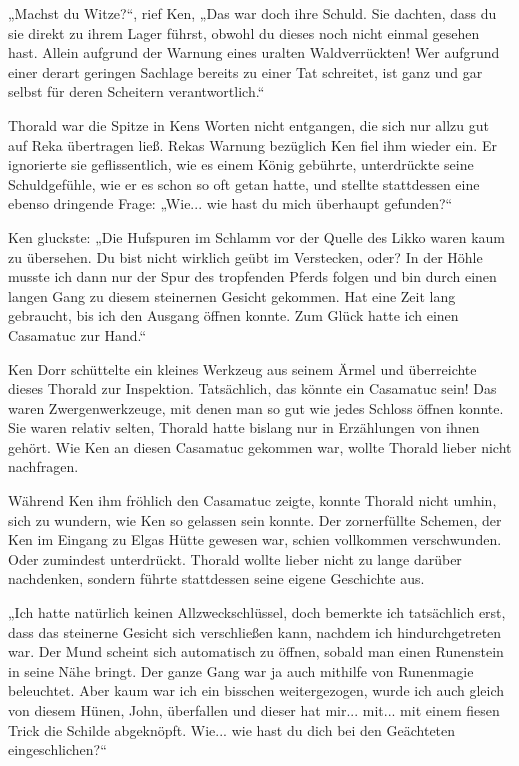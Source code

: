 „Machst du Witze?“, rief Ken, „Das war doch ihre Schuld. Sie dachten, dass du sie direkt zu ihrem Lager führst, obwohl du dieses noch nicht einmal gesehen hast. Allein aufgrund der Warnung eines uralten Waldverrückten! Wer aufgrund einer derart geringen Sachlage bereits zu einer Tat schreitet, ist ganz und gar selbst für deren Scheitern verantwortlich.“

Thorald war die Spitze in Kens Worten nicht entgangen, die sich nur allzu gut auf Reka übertragen ließ. Rekas Warnung bezüglich Ken fiel ihm wieder ein. Er ignorierte sie geflissentlich, wie es einem König gebührte, unterdrückte seine Schuldgefühle, wie er es schon so oft getan hatte, und stellte stattdessen eine ebenso dringende Frage: „Wie... wie hast du mich überhaupt gefunden?“

Ken gluckste: „Die Hufspuren im Schlamm vor der Quelle des Likko waren kaum zu übersehen. Du bist nicht wirklich geübt im Verstecken, oder? In der Höhle musste ich dann nur der Spur des tropfenden Pferds folgen und bin durch einen langen Gang zu diesem steinernen Gesicht gekommen. Hat eine Zeit lang gebraucht, bis ich den Ausgang öffnen konnte. Zum Glück hatte ich einen Casamatuc zur Hand.“

Ken Dorr schüttelte ein kleines Werkzeug aus seinem Ärmel und überreichte dieses Thorald zur Inspektion. Tatsächlich, das könnte ein Casamatuc sein! Das waren Zwergenwerkzeuge, mit denen man so gut wie jedes Schloss öffnen konnte. Sie waren relativ selten, Thorald hatte bislang nur in Erzählungen von ihnen gehört. Wie Ken an diesen Casamatuc gekommen war, wollte Thorald lieber nicht nachfragen.

Während Ken ihm fröhlich den Casamatuc zeigte, konnte Thorald nicht umhin, sich zu wundern, wie Ken so gelassen sein konnte. Der zornerfüllte Schemen, der Ken im Eingang zu Elgas Hütte gewesen war, schien vollkommen verschwunden. Oder zumindest unterdrückt. Thorald wollte lieber nicht zu lange darüber nachdenken, sondern führte stattdessen seine eigene Geschichte aus.

„Ich hatte natürlich keinen Allzweckschlüssel, doch bemerkte ich tatsächlich erst, dass das steinerne Gesicht sich verschließen kann, nachdem ich hindurchgetreten war. Der Mund scheint sich automatisch zu öffnen, sobald man einen Runenstein in seine Nähe bringt. Der ganze Gang war ja auch mithilfe von Runenmagie beleuchtet. Aber kaum war ich ein bisschen weitergezogen, wurde ich auch gleich von diesem Hünen, John, überfallen und dieser hat mir... mit... mit einem fiesen Trick die Schilde abgeknöpft. Wie... wie hast du dich bei den Geächteten eingeschlichen?“

